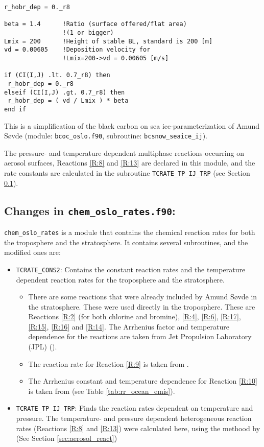 \begin{lstlisting}
r_hobr_dep = 0._r8

beta = 1.4      !Ratio (surface offered/flat area)
                !(1 or bigger)
Lmix = 200      !Height of stable BL, standard is 200 [m]
vd = 0.00605    !Deposition velocity for 
                !Lmix=200->vd = 0.00605 [m/s]

if (CI(I,J) .lt. 0.7_r8) then
 r_hobr_dep = 0._r8
elseif (CI(I,J) .gt. 0.7_r8) then
 r_hobr_dep = ( vd / Lmix ) * beta
end if
\end{lstlisting}

This is a simplification of the black carbon on sea ice-parameterization of Amund Søvde (module: \texttt{bcoc\_oslo.f90}, subroutine: \texttt{bcsnow\_seaice\_ij}). 

\medskip 

 
The pressure- and temperature dependent multiphase reactions occurring on aerosol surfaces, Reactions \ref{R:8} and \ref{R:13} are declared in this module, and the rate constants are calculated in the subroutine \texttt{TCRATE\_TP\_IJ\_TRP} (see Section \ref{sec:chem_oslo_rates}). 



\subsection{Changes in \texttt{chem\_oslo\_rates.f90}:}\label{sec:chem_oslo_rates}



\texttt{chem\_oslo\_rates} is a module that contains the chemical reaction rates for both the troposphere and the stratosphere. It contains several subroutines, and the modified ones are: 

\begin{itemize}
    \item \texttt{TCRATE\_CONS2}: Contains the constant reaction rates and the temperature dependent reaction rates for the troposphere and the stratosphere. 
    \begin{itemize}
        \item There are some reactions that were already included by Amund Søvde \cite{SovdeManual} in the stratosphere. These were used directly in the troposphere. These are Reactions \ref{R:2} (for both chlorine and bromine),  \ref{R:4}, \ref{R:6}, \ref{R:17}, \ref{R:15}, \ref{R:16} and \ref{R:14}. The Arrhenius factor and temperature dependence for the reactions are taken from Jet Propulsion Laboratory (JPL) (\cite{JPL}). 
        \item The reaction rate for Reaction \ref{R:9} is taken from \cite{CAO}.
        \item The Arrhenius constant and temperature dependence for Reaction \ref{R:10} is taken from \cite{Parella}(see Table \ref{tab:rr_ocean_emis}). 
    \end{itemize}
    \item \texttt{TCRATE\_TP\_IJ\_TRP}: Finds the reaction rates dependent on temperature and pressure. The temperature- and pressure dependent heterogeneous reaction rates (Reactions \ref{R:8} and \ref{R:13}) were calculated here, using the methood by \cite{CAO} (See Section \ref{sec:aerosol_react})
\end{itemize}

